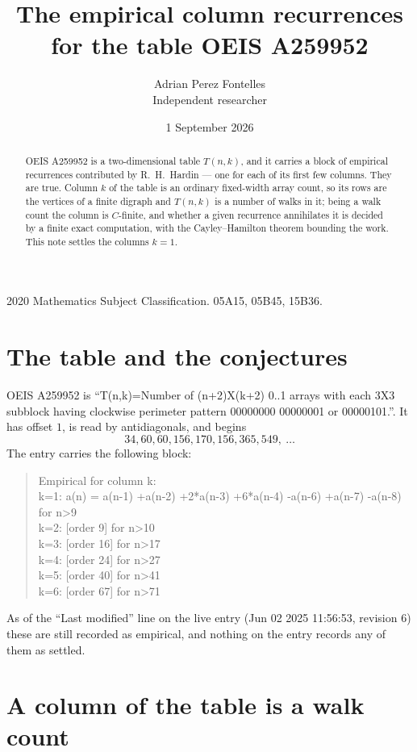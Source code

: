 \documentclass[11pt,a4paper]{article}
\title{The empirical column recurrences for the table OEIS A259952}
\author{Adrian Perez Fontelles\\ \small Independent researcher}
\date{1 September 2026}
\theoremstyle{plain}
\theoremstyle{definition}
\begin{document}
\maketitle

\begin{abstract}
OEIS A259952 is a two-dimensional table $T(n,k)$, and it carries a block of empirical
recurrences contributed by R.~H.~Hardin --- one for each of its first few columns. They are
true. Column $k$ of the table is an ordinary fixed-width array count, so its rows are the
vertices of a finite digraph and $T(n,k)$ is a number of walks in it; being a walk count the
column is $C$-finite, and whether a given recurrence annihilates it is decided by a finite
exact computation, with the Cayley--Hamilton theorem bounding the work. This note settles the columns $k=1$.
\end{abstract}

\noindent\small 2020 Mathematics Subject Classification. 05A15, 05B45, 15B36.\normalsize

\section{The table and the conjectures}

OEIS A259952 is ``T(n,k)=Number of (n+2)X(k+2) 0..1 arrays with each 3X3 subblock having clockwise perimeter pattern 00000000 00000001 or 00000101.''. It has offset $1$, is
read by antidiagonals, and begins
\[
34, 60, 60, 156, 170, 156, 365, 549,\ \dots
\]
The entry carries the following block:
\begin{quote}\small
Empirical for column k:\\
k=1: a(n) = a(n-1) +a(n-2) +2*a(n-3) +6*a(n-4) -a(n-6) +a(n-7) -a(n-8) for n>9\\
k=2: [order 9] for n>10\\
k=3: [order 16] for n>17\\
k=4: [order 24] for n>27\\
k=5: [order 40] for n>41\\
k=6: [order 67] for n>71\\
\end{quote}
As of the ``Last modified'' line on the live entry (Jun 02 2025 11:56:53, revision 6) these are still
recorded as empirical, and nothing on the entry records any of them as settled.

\section{A column of the table is a walk count}
\end{document}

